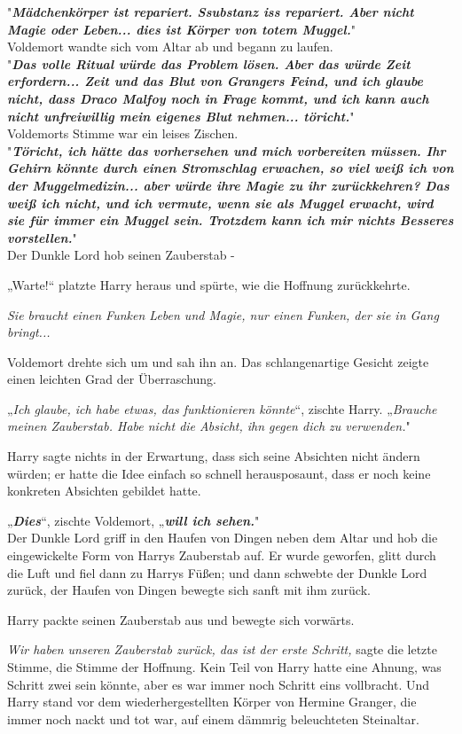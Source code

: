 {"\textbf{\emph{Mädchenkörper ist repariert. Ssubstanz iss repariert. Aber nicht Magie oder Leben... dies ist Körper von totem Muggel.}}"\\ Voldemort wandte sich vom Altar ab und begann zu laufen.\\ "\textbf{\emph{Das volle Ritual würde das Problem lösen. Aber das würde Zeit erfordern... Zeit und das Blut von Grangers Feind, und ich glaube nicht, dass Draco Malfoy noch in Frage kommt, und ich kann auch nicht unfreiwillig mein eigenes Blut nehmen... töricht.}}"\\ Voldemorts Stimme war ein leises Zischen.\\ "\textbf{\emph{Töricht, ich hätte das vorhersehen und mich vorbereiten müssen. Ihr Gehirn könnte durch einen Stromschlag erwachen, so viel weiß ich von der Muggelmedizin... aber würde ihre Magie zu ihr zurückkehren? Das weiß ich nicht, und ich vermute, wenn sie als Muggel erwacht, wird sie für immer ein Muggel sein. Trotzdem kann ich mir nichts Besseres vorstellen.}}"\\ Der Dunkle Lord hob seinen Zauberstab -

„Warte!“ platzte Harry heraus und spürte, wie die Hoffnung zurückkehrte.

\emph{Sie braucht einen Funken Leben und Magie, nur einen Funken, der sie in Gang bringt...}

Voldemort drehte sich um und sah ihn an. Das schlangenartige Gesicht zeigte einen leichten Grad der Überraschung.

„\emph{Ich glaube, ich habe etwas, das funktionieren könnte}“, zischte Harry. „\emph{Brauche meinen Zauberstab. Habe nicht die Absicht, ihn gegen dich zu verwenden.}"

Harry sagte nichts in der Erwartung, dass sich seine Absichten nicht ändern würden; er hatte die Idee einfach so schnell herausposaunt, dass er noch keine konkreten Absichten gebildet hatte.

„\textbf{\emph{Dies}}“, zischte Voldemort, „\textbf{\emph{will ich sehen.}}"\\ Der Dunkle Lord griff in den Haufen von Dingen neben dem Altar und hob die eingewickelte Form von Harrys Zauberstab auf. Er wurde geworfen, glitt durch die Luft und fiel dann zu Harrys Füßen; und dann schwebte der Dunkle Lord zurück, der Haufen von Dingen bewegte sich sanft mit ihm zurück.

Harry packte seinen Zauberstab aus und bewegte sich vorwärts.

\emph{Wir haben unseren Zauberstab zurück, das ist der erste Schritt,} sagte die letzte Stimme, die Stimme der Hoffnung. Kein Teil von Harry hatte eine Ahnung, was Schritt zwei sein könnte, aber es war immer noch Schritt eins vollbracht. Und Harry stand vor dem wiederhergestellten Körper von Hermine Granger, die immer noch nackt und tot war, auf einem dämmrig beleuchteten Steinaltar.

}
